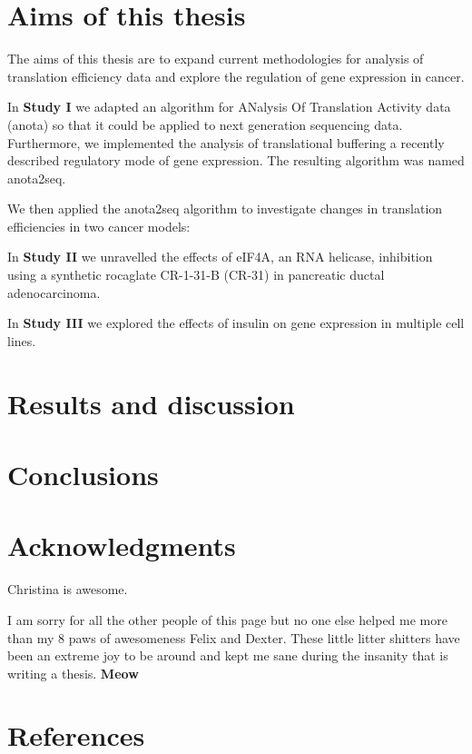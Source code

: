 \documentclass[
  12pt,
  openany]{book}
\begin{document}
\chapter{Aims of this thesis}

The aims of this thesis are to expand current methodologies for analysis of translation efficiency data and explore the regulation of gene expression in cancer.

In \textbf{Study I} we adapted an algorithm for ANalysis Of Translation Activity data (anota) so that it could be applied to next generation sequencing data. Furthermore, we implemented the analysis of translational buffering a recently described regulatory mode of gene expression. The resulting algorithm was named anota2seq.

We then applied the anota2seq algorithm to investigate changes in translation efficiencies in two cancer models:

In \textbf{Study II} we unravelled the effects of eIF4A, an RNA helicase, inhibition using a synthetic rocaglate CR-1-31-B (CR-31) in pancreatic ductal adenocarcinoma.

In \textbf{Study III} we explored the effects of insulin on gene expression in multiple cell lines.

\chapter{Results and discussion}

\chapter{Conclusions}

\hypertarget{acknowledgments}{%
\chapter*{Acknowledgments}\label{acknowledgments}}

Christina is awesome.

I am sorry for all the other people of this page but no one else helped me more than my 8 paws of awesomeness Felix and Dexter. These little litter shitters have been an extreme joy to be around and kept me sane during the insanity that is writing a thesis. \textbf{Meow}

\hypertarget{references}{%
\chapter*{References}\label{references}}
\end{document}
